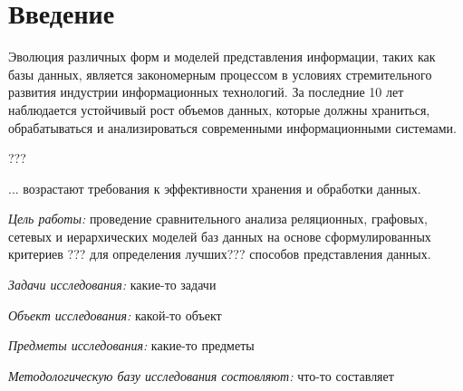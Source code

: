 \section{Введение}

Эволюция различных форм и моделей представления информации,
таких как базы данных, является закономерным процессом в условиях 
стремительного развития индустрии информационных технологий. За 
последние 10 лет наблюдается устойчивый рост
объемов данных, которые должны храниться, обрабатываться и 
анализироваться современными информационными системами. 

???

... возрастают требования к эффективности хранения и обработки данных.


\textit{Цель работы:} проведение сравнительного анализа реляционных,
графовых, сетевых и иерархических моделей баз данных на основе 
сформулированных критериев ??? для определения лучших??? способов 
представления данных.

\textit{Задачи исследования:} какие-то задачи

\textit{Объект исследования:} какой-то объект

\textit{Предметы исследования:} какие-то предметы

\textit{Методологическую базу исследования состовляют:} что-то 
составляет
